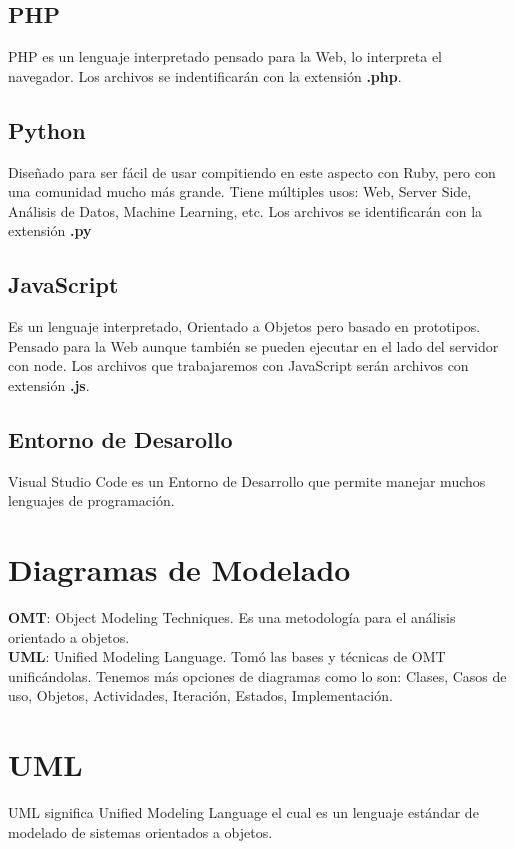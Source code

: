 \documentclass{article}
\begin{document}
\subsection*{PHP}%
PHP es un lenguaje interpretado pensado para la Web, lo interpreta el
navegador. Los archivos se indentificarán con la extensión \textbf{.php}.

\subsection*{Python}%
Diseñado para ser fácil de usar compitiendo en este aspecto con Ruby, pero 
con una comunidad mucho más grande. Tiene múltiples usos: Web, Server Side,
Análisis de Datos, Machine Learning, etc. Los archivos se identificarán con la
extensión \textbf{.py}

\subsection*{JavaScript}%
Es un lenguaje interpretado, Orientado a Objetos pero basado en prototipos.
Pensado para la Web aunque también se pueden ejecutar en el lado del servidor
con node. Los archivos que trabajaremos con JavaScript serán archivos con
extensión \textbf{.js}.

\subsection*{Entorno de Desarollo}%
Visual Studio Code es un Entorno de Desarrollo que permite manejar muchos
lenguajes de programación.


\section{Diagramas de Modelado}%

\textbf{OMT}: Object Modeling Techniques. Es una metodología para el análisis
orientado a objetos.\\

\textbf{UML}: Unified Modeling Language. Tomó las bases y técnicas de OMT
unificándolas. Tenemos más opciones de diagramas como lo son: Clases, Casos de
uso, Objetos, Actividades, Iteración, Estados, Implementación.

\section{UML}%
UML significa Unified Modeling Language el cual es un lenguaje estándar de
modelado de sistemas orientados a objetos.
\end{document}
